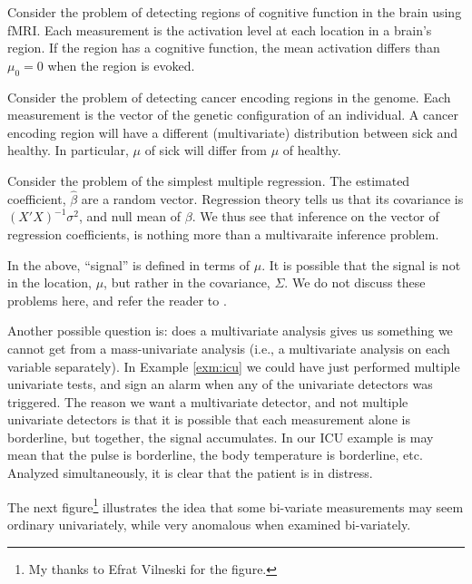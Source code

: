 \documentclass[]{book}
\theoremstyle{definition}
\theoremstyle{definition}
\theoremstyle{definition}
\theoremstyle{remark}
\let\BeginKnitrBlock\begin \let\EndKnitrBlock\end
\begin{document}
\BeginKnitrBlock{example}
\protect\hypertarget{exm:brain-imaging}{}{\label{exm:brain-imaging} }Consider the problem of detecting regions of cognitive function in the brain using fMRI.
Each measurement is the activation level at each location in a brain's region.
If the region has a cognitive function, the mean activation differs than \(\mu_0=0\) when the region is evoked.
\EndKnitrBlock{example}

\BeginKnitrBlock{example}
\protect\hypertarget{exm:genetics}{}{\label{exm:genetics} }Consider the problem of detecting cancer encoding regions in the genome.
Each measurement is the vector of the genetic configuration of an individual.
A cancer encoding region will have a different (multivariate) distribution between sick and healthy.
In particular, \(\mu\) of sick will differ from \(\mu\) of healthy.
\EndKnitrBlock{example}

\BeginKnitrBlock{example}
\protect\hypertarget{exm:regression}{}{\label{exm:regression} }Consider the problem of the simplest multiple regression.
The estimated coefficient, \(\hat \beta\) are a random vector.
Regression theory tells us that its covariance is \((X'X)^{-1}\sigma^2\), and null mean of \(\beta\).
We thus see that inference on the vector of regression coefficients, is nothing more than a multivaraite inference problem.
\EndKnitrBlock{example}

\BeginKnitrBlock{remark}
{}In the above, ``signal'' is defined in terms of \(\mu\).
It is possible that the signal is not in the location, \(\mu\), but rather in the covariance, \(\Sigma\).
We do not discuss these problems here, and refer the reader to \citet{nadler2008finite}.
\EndKnitrBlock{remark}

Another possible question is: does a multivariate analysis gives us something we cannot get from a mass-univariate analysis (i.e., a multivariate analysis on each variable separately).
In Example \ref{exm:icu} we could have just performed multiple univariate tests, and sign an alarm when any of the univariate detectors was triggered.
The reason we want a multivariate detector, and not multiple univariate detectors is that it is possible that each measurement alone is borderline, but together, the signal accumulates.
In our ICU example is may mean that the pulse is borderline, the body temperature is borderline, etc. Analyzed simultaneously, it is clear that the patient is in distress.

The next figure\footnote{My thanks to Efrat Vilneski for the figure.} illustrates the idea that some bi-variate measurements may seem ordinary univariately, while very anomalous when examined bi-variately.
\end{document}
